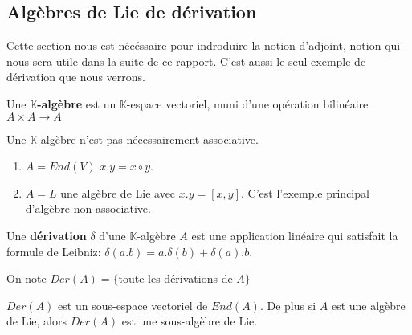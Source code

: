 \documentclass[a4paper,openany,12pt]{report}
\newcommand{\KK}{\mathbb{K}}
\theoremstyle{break}
{\theorembodyfont{\upshape}
\newtheorem*{rmq}{Remarque :}
\newtheorem*{prv}{Preuve :}
\newtheorem*{ex}{Exemples :}
\newtheorem*{exe}{Exemple : }
\newtheorem*{nota}{Notation :}
\newtheorem*{dem}{D\'emonstration :}}
\begin{document}
\subsection{Algèbres de Lie de  dérivation}

\quad Cette section nous est nécéssaire pour indroduire la notion d'adjoint, notion qui nous sera utile dans la suite de ce rapport. C'est aussi le seul exemple de dérivation que nous verrons.

\begin{df}
\quad Une \textbf{$\KK$-algèbre} est un $\KK$-espace vectoriel, muni d'une opération bilinéaire $A \times A \to  A$
\end{df}

\begin{rmq}
Une $\KK$-algèbre n'est pas nécessairement associative.
\end{rmq}

\begin{ex}
\begin{enumerate}
\item $A=End(V)$ \quad $x.y=x\circ y$.

\item $A=L$ une algèbre de Lie avec $x. y= [x,y]$. C'est l'exemple principal d'algèbre non-associative.
\end{enumerate}
\end{ex}

\begin{df}
\quad Une \textbf{dérivation} $\delta$ d'une $\KK$-algèbre $A$ est une application linéaire qui satisfait la formule de Leibniz:
\center $\delta(a.b)=a.\delta(b)+\delta(a).b$.
\end{df}

\begin{nota}
\quad On note $Der(A)=\{ $toute les dérivations de $A \}$
\end{nota}

\begin{prop}
\quad $Der(A)$ est un sous-espace vectoriel de $End(A)$.
De plus si $A$ est une algèbre de Lie, alors $Der(A)$ est une sous-algèbre de Lie. 
\end{prop}

\end{document}
